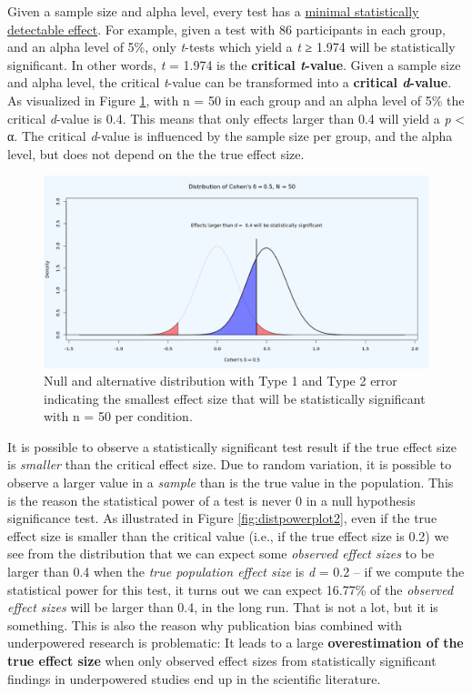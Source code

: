 \documentclass[
  oneside]{book}
\begin{document}
Given a sample size and alpha level, every test has a \protect\hyperlink{minimaldetectable}{minimal statistically detectable effect}. For example, given a test with 86 participants in each group, and an alpha level of 5\%, only \emph{t}-tests which yield a \emph{t} ≥ 1.974 will be statistically significant. In other words, \emph{t} = 1.974 is the \textbf{critical \emph{t}-value}. Given a sample size and alpha level, the critical \emph{t}-value can be transformed into a \textbf{critical \emph{d}-value}. As visualized in Figure \ref{fig:distpowerplot1}, with n = 50 in each group and an alpha level of 5\% the critical \emph{d}-value is 0.4. This means that only effects larger than 0.4 will yield a \emph{p} \textless{} α. The critical \emph{d}-value is influenced by the sample size per group, and the alpha level, but does not depend on the the true effect size.

\begin{figure}

{\centering \includegraphics[width=1\linewidth]{images/dpplot50} 

}

\caption{Null and alternative distribution with Type 1 and Type 2 error indicating the smallest effect size that will be statistically significant with n = 50 per condition.}\label{fig:distpowerplot1}
\end{figure}

It is possible to observe a statistically significant test result if the true effect size is \emph{smaller} than the critical effect size. Due to random variation, it is possible to observe a larger value in a \emph{sample} than is the true value in the population. This is the reason the statistical power of a test is never 0 in a null hypothesis significance test. As illustrated in Figure \ref{fig:distpowerplot2}, even if the true effect size is smaller than the critical value (i.e., if the true effect size is 0.2) we see from the distribution that we can expect some \emph{observed effect sizes} to be larger than 0.4 when the \emph{true population effect size} is \emph{d} = 0.2 -- if we compute the statistical power for this test, it turns out we can expect 16.77\% of the \emph{observed effect sizes} will be larger than 0.4, in the long run. That is not a lot, but it is something. This is also the reason why publication bias combined with underpowered research is problematic: It leads to a large \textbf{overestimation of the true effect size} when only observed effect sizes from statistically significant findings in underpowered studies end up in the scientific literature.
\end{document}
